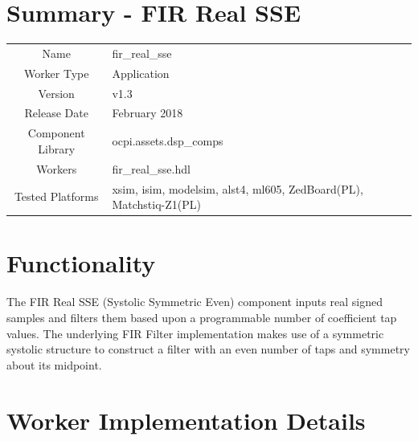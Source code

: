 \documentclass{article}
\author{} %
\date{Version \docVersion} %
\title{\docTitle}
\def\docVersion{1.3}
\def\comp{fir\_real\_sse}
\def\Comp{FIR Real SSE}
\begin{document}
\section*{Summary - \Comp}
\begin{tabular}{|c|M{13.5cm}|}
	\hline
	                  &                                                              \\
	\hline
	Name              & \comp                                                        \\
	\hline
	Worker Type       & Application                                                  \\
	\hline
	Version           & v\docVersion \\
	\hline
	Release Date      & February 2018 \\
	\hline
	Component Library & ocpi.assets.dsp\_comps                                        \\
	\hline
	Workers           & \comp.hdl                                                    \\
	\hline
	Tested Platforms  & xsim, isim, modelsim, alst4, ml605, ZedBoard(PL), Matchstiq-Z1(PL) \\
	\hline
\end{tabular}

\section*{Functionality}
\begin{flushleft}
	The FIR Real SSE (Systolic Symmetric Even) component inputs real signed samples and filters them based upon a programmable number of coefficient tap values. The underlying FIR Filter implementation makes use of a symmetric systolic structure to construct a filter with an even number of taps and symmetry about its midpoint.
\end{flushleft}

\section*{Worker Implementation Details}
\end{document}
